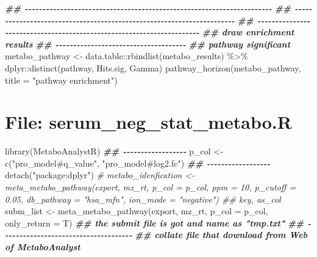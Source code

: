 \documentclass[
]{article}
\newenvironment{Shaded}{\begin{snugshade}}{\end{snugshade}}
\newcommand{\AttributeTok}[1]{\textcolor[rgb]{0.77,0.63,0.00}{#1}}
\newcommand{\CommentTok}[1]{\textcolor[rgb]{0.56,0.35,0.01}{\textit{#1}}}
\newcommand{\DocumentationTok}[1]{\textcolor[rgb]{0.56,0.35,0.01}{\textbf{\textit{#1}}}}
\newcommand{\FunctionTok}[1]{\textcolor[rgb]{0.00,0.00,0.00}{#1}}
\newcommand{\NormalTok}[1]{#1}
\newcommand{\OtherTok}[1]{\textcolor[rgb]{0.56,0.35,0.01}{#1}}
\newcommand{\SpecialCharTok}[1]{\textcolor[rgb]{0.00,0.00,0.00}{#1}}
\newcommand{\StringTok}[1]{\textcolor[rgb]{0.31,0.60,0.02}{#1}}
\begin{document}
\begin{Shaded}
\begin{Highlighting}[]
\DocumentationTok{\#\# {-}{-}{-}{-}{-}{-}{-}{-}{-}{-}{-}{-}{-}{-}{-}{-}{-}{-}{-}{-}{-}{-}{-}{-}{-}{-}{-}{-}{-}{-}{-}{-}{-}{-}{-}{-}{-}{-}{-}{-}{-}{-}{-}{-}{-}{-}{-}{-}{-}{-}{-}{-}{-}{-}{-}{-}{-}{-}{-}{-}{-}{-}{-}{-}{-}{-}{-}{-}{-}{-} }
\DocumentationTok{\#\# {-}{-}{-}{-}{-}{-}{-}{-}{-}{-}{-}{-}{-}{-}{-}{-}{-}{-}{-}{-}{-}{-}{-}{-}{-}{-}{-}{-}{-}{-}{-}{-}{-}{-}{-}{-}{-}{-}{-}{-}{-}{-}{-}{-}{-}{-}{-}{-}{-}{-}{-}{-}{-}{-}{-}{-}{-}{-}{-}{-}{-}{-}{-}{-}{-}{-}{-}{-}{-}{-} }
\DocumentationTok{\#\# {-}{-}{-}{-}{-}{-}{-}{-}{-}{-}{-}{-}{-}{-}{-}{-}{-}{-}{-}{-}{-}{-}{-}{-}{-}{-}{-}{-}{-}{-}{-}{-}{-}{-}{-}{-}{-}{-}{-}{-}{-}{-}{-}{-}{-}{-}{-}{-}{-}{-}{-}{-}{-}{-}{-}{-}{-}{-}{-}{-}{-}{-}{-}{-}{-}{-}{-}{-}{-}{-} }
\DocumentationTok{\#\# draw enrichment results }
\DocumentationTok{\#\# {-}{-}{-}{-}{-}{-}{-}{-}{-}{-}{-}{-}{-}{-}{-}{-}{-}{-}{-}{-}{-}{-}{-}{-}{-}{-}{-}{-}{-}{-}{-}{-}{-}{-}{-}{-}{-} }
\DocumentationTok{\#\# pathway significant}
\NormalTok{metabo\_pathway }\OtherTok{\textless{}{-}}\NormalTok{ data.table}\SpecialCharTok{::}\FunctionTok{rbindlist}\NormalTok{(metabo\_results) }\SpecialCharTok{\%\textgreater{}\%} 
\NormalTok{  dplyr}\SpecialCharTok{::}\FunctionTok{distinct}\NormalTok{(pathway, Hits.sig, Gamma)}
\FunctionTok{pathway\_horizon}\NormalTok{(metabo\_pathway, }\AttributeTok{title =} \StringTok{"pathway enrichment"}\NormalTok{)}
\end{Highlighting}
\end{Shaded}

\hypertarget{file-serum_neg_stat_metabo.r}{%
\section{File: serum\_neg\_stat\_metabo.R}\label{file-serum_neg_stat_metabo.r}}

\begin{Shaded}
\begin{Highlighting}[]
\FunctionTok{library}\NormalTok{(MetaboAnalystR)}
\DocumentationTok{\#\# {-}{-}{-}{-}{-}{-}{-}{-}{-}{-}{-}{-}{-}{-}{-}{-}{-}{-} }
\NormalTok{p\_col }\OtherTok{\textless{}{-}} \FunctionTok{c}\NormalTok{(}\StringTok{"pro\_model\#q\_value"}\NormalTok{, }\StringTok{"pro\_model\#log2.fc"}\NormalTok{)}
\DocumentationTok{\#\# {-}{-}{-}{-}{-}{-}{-}{-}{-}{-}{-}{-}{-}{-}{-}{-}{-}{-} }
\FunctionTok{detach}\NormalTok{(}\StringTok{"package:dplyr"}\NormalTok{)}
\CommentTok{\# metabo\_idenfication \textless{}{-} meta\_metabo\_pathway(export, mz\_rt, p\_col = p\_col, ppm = 10, p\_cutoff = 0.05, db\_pathway = "hsa\_mfn", ion\_mode = "negative") \#\# \textasciigrave{}key\textasciigrave{}, \textasciigrave{}as\_col\textasciigrave{}}
\NormalTok{subm\_list }\OtherTok{\textless{}{-}} \FunctionTok{meta\_metabo\_pathway}\NormalTok{(export, mz\_rt, }\AttributeTok{p\_col =}\NormalTok{ p\_col, }\AttributeTok{only\_return =}\NormalTok{ T)}
\DocumentationTok{\#\# the submit file is got and name as "tmp.txt"}
\DocumentationTok{\#\# {-}{-}{-}{-}{-}{-}{-}{-}{-}{-}{-}{-}{-}{-}{-}{-}{-}{-}{-}{-}{-}{-}{-}{-}{-}{-}{-}{-}{-}{-}{-}{-}{-}{-}{-}{-}{-} }
\DocumentationTok{\#\# collate file that download from Web of MetaboAnalyst}
\end{Highlighting}
\end{Shaded}
\end{document}

